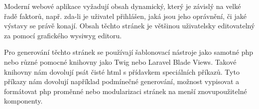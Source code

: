 Moderní webové aplikace vyžadují obsah dynamický, který je závislý na velké řadě faktorů, např. zda-li je uživatel přihlášen, jaká jsou jeho oprávnění, či jaké výstavy se právě konají. Obsah těchto stránek je většinou uživatelsky editovatelný za pomocí grafického \acrshort{wysiwyg} editoru.

Pro generování těchto stránek se používají šablonovací nástroje jako samotné \acrshort{php} nebo různé pomocné knihovny jako Twig\cite{twig} nebo Laravel Blade Views\cite{laravel-blade}. Takové knihovny nám dovolují psát čisté \acrshort{html} s přídavkem speciálních příkazů. Tyto příkazy nám dovolují například podmínečné generování, možnost vypisovat a formátovat \acrshort{php} proměnné nebo modularizaci stránek na menší znovupoužitelné komponenty.
